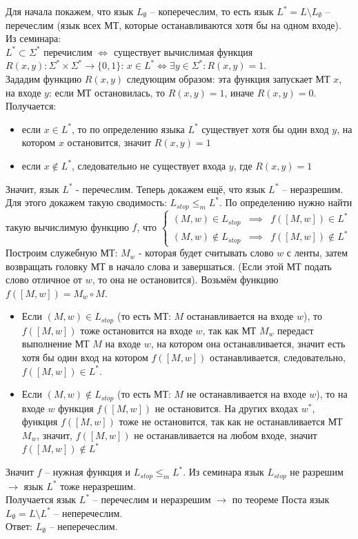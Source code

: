 \documentclass[a4paper,12pt]{article} %
\begin{document}
Для начала покажем, что язык $L_\emptyset$ -- коперечеслим, то есть язык $ L^* = L \setminus L_\emptyset $ -- перечеслим (язык всех МТ, которые останавливаются хотя бы на одном входе). Из семинара:\\
$L^* \subset \Sigma^*$ перечислим $\iff$ существует вычислимая функция $R(x, y): \Sigma^*\times\Sigma^* \rightarrow \{0, 1\}$: $x\in L^* \iff \exists y \in \Sigma^*: R(x, y) = 1$.\\ 
Зададим функцию $ R(x,y) $ следующим образом: эта функция запускает МТ $ x $, на входе $ y $: 
если МТ остановилась, то $ R(x,y) = 1 $, иначе $ R(x,y) = 0 $.
Получается:\\
\begin{itemize}
\item если $ x\in L^*  $, то по определению языка $ L^* $ существует хотя бы один вход $ y $, на котором $ x $ остановится, значит $ R(x,y)=1 $\\
\item если $ x\notin L^*  $, следовательно не существует входа $ y $, где $ R(x,y)=1 $\\
\end{itemize}
Значит, язык $ L^* $ - перечеслим. Теперь докажем ещё, что язык $ L^* $ -- неразрешим. Для этого докажем такую сводимость: $ L_{stop} \leq_m L^* $. По определению нужно найти такую вычислимую функцию $ f $, что 
$\left \{\begin{array}{ccc} (M,w) \in L_{stop} & \implies & f([M,w]) \in L^* \\ (M,w) \not \in L_{stop} & \implies & f([M,w]) \not \in L^* \end{array}\right.$\\
Построим служебную МТ: $ M_w $ - которая будет считывать слово $ w $ с ленты, затем возвращать головку МТ в начало слова и завершаться. (Если этой МТ подать слово отличное от $ w $, то она не остановится). Возьмём функцию $ f([M,w])= M_w \circ M  $.
\begin{itemize}
\item Если $ (M,w)\in L_{stop} $ (то есть МТ: $ M $ останавливается на входе $ w $), то $ f([M,w]) $ тоже остановится на входе $ w $, так как МТ $M_w $ передаст выполнение МТ $ M $ на входе $ w $, на котором она останавливается, значит есть хотя бы один вход на котором $ f([M,w]) $ останавливается, следовательно, $ f([M,w]) \in L^*$.
\item Если $ (M,w)\notin L_{stop} $ (то есть МТ: $ M $ не останавливается на входе $ w $), то на входе $ w $ функция $ f([M,w]) $ не остановится. На других входах $ w^* $, функция $ f([M,w]) $ тоже не остановится, так как не останавливается МТ $ M_w $, значит, $ f([M,w]) $ не останавливается на любом входе, значит $ f([M,w]) \notin L^*$
\end{itemize}
Значит $ f $ -- нужная функция и $ L_{stop} \leq_m L^* $. Из семинара язык $ L_{stop} $ не разрешим $ \longrightarrow $ язык $ L^* $ тоже неразрешим.\\
Получается язык $ L^* $ -- перечеслим и неразрешим $ \longrightarrow $ по теореме Поста язык $L_\emptyset = L \setminus L^*$ -- неперечеслим.\\
Ответ: $L_\emptyset$ -- неперечеслим.
 
\end{document}
